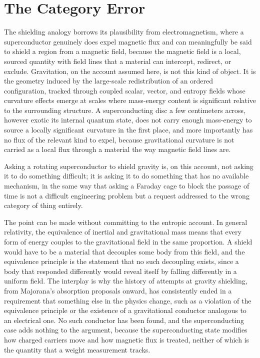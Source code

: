 \documentclass[11pt]{article}
\begin{document}
\section{The Category Error}

The shielding analogy borrows its plausibility from electromagnetism, where a superconductor genuinely does expel magnetic flux and can meaningfully be said to shield a region from a magnetic field, because the magnetic field is a local, sourced quantity with field lines that a material can intercept, redirect, or exclude. Gravitation, on the account assumed here, is not this kind of object. It is the geometry induced by the large-scale redistribution of an ordered configuration, tracked through coupled scalar, vector, and entropy fields whose curvature effects emerge at scales where mass-energy content is significant relative to the surrounding structure. A superconducting disc a few centimeters across, however exotic its internal quantum state, does not carry enough mass-energy to source a locally significant curvature in the first place, and more importantly has no flux of the relevant kind to expel, because gravitational curvature is not carried as a local flux through a material the way magnetic field lines are.

Asking a rotating superconductor to shield gravity is, on this account, not asking it to do something difficult; it is asking it to do something that has no available mechanism, in the same way that asking a Faraday cage to block the passage of time is not a difficult engineering problem but a request addressed to the wrong category of thing entirely.

The point can be made without committing to the entropic account. In general relativity, the equivalence of inertial and gravitational mass means that every form of energy couples to the gravitational field in the same proportion. A shield would have to be a material that decouples some body from this field, and the equivalence principle is the statement that no such decoupling exists, since a body that responded differently would reveal itself by falling differently in a uniform field. The interplay is why the history of attempts at gravity shielding, from Majorana's absorption proposals onward, has consistently ended in a requirement that something else in the physics change, such as a violation of the equivalence principle or the existence of a gravitational conductor analogous to an electrical one. No such conductor has been found, and the superconducting case adds nothing to the argument, because the superconducting state modifies how charged carriers move and how magnetic flux is treated, neither of which is the quantity that a weight measurement tracks.
\end{document}
